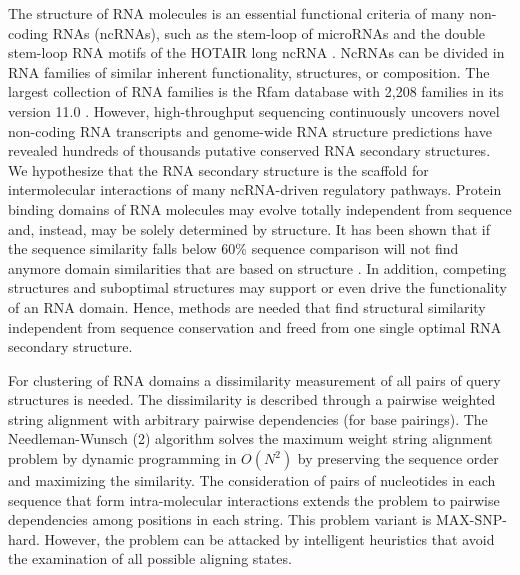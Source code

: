 \documentclass[a4paper,twoside]{article}
\begin{document}
\noindent The structure of RNA molecules is an essential functional criteria of
many non-coding RNAs (ncRNAs), such as the stem-loop of microRNAs and the double
stem-loop RNA motifs of the HOTAIR long ncRNA \cite{Gupta20393566}. NcRNAs can
be divided in RNA families of similar inherent functionality, structures, or
composition. The largest collection of RNA families is the Rfam database with
2,208 families in its version 11.0 \cite{Burge23125362}. However, high-throughput
sequencing continuously uncovers novel non-coding RNA transcripts and
genome-wide RNA structure predictions have revealed hundreds of thousands
putative conserved RNA secondary structures. We hypothesize that the RNA
secondary structure is the scaffold for intermolecular interactions of many
ncRNA-driven regulatory pathways. Protein binding domains of RNA molecules may
evolve totally independent from sequence and, instead, may be solely determined
by structure. It has been shown that if the sequence similarity falls below 60\%
sequence comparison will not find anymore domain similarities that are based on
structure \cite{Gardner15860779}. In addition, competing structures and
suboptimal structures may support or even drive the functionality of an RNA
domain. Hence, methods are needed that find structural similarity independent
from sequence conservation and freed from one single optimal RNA secondary
structure.

For clustering of RNA domains a dissimilarity measurement of all pairs of query
structures is needed. The dissimilarity is described through a pairwise weighted
string alignment with arbitrary pairwise dependencies (for base pairings). The
Needleman-Wunsch (2) algorithm solves the maximum weight string alignment
problem by dynamic programming in $O(N^2)$ by preserving the sequence order and
maximizing the similarity. The consideration of pairs of nucleotides in each
sequence that form intra-molecular interactions extends the problem to pairwise
dependencies among positions in each string. This problem variant is
MAX-SNP-hard. However, the problem can be attacked by intelligent heuristics
that avoid the examination of all possible aligning states.
\end{document}
